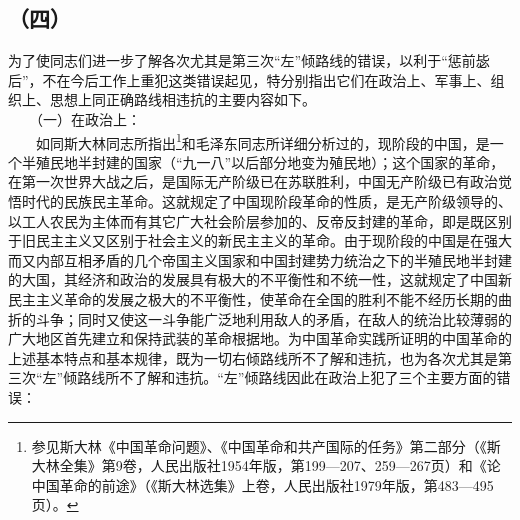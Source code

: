 \documentclass[cn,11pt,chinese]{elegantbook}
\def\myformat#1{\hfil\hfil #1}
\begin{document}
\subsection*{\myformat{（四）}}
为了使同志们进一步了解各次尤其是第三次“左”倾路线的错误，以利于“惩前毖后”，不在今后工作上重犯这类错误起见，特分别指出它们在政治上、军事上、组织上、思想上同正确路线相违抗的主要内容如下。\\
　　（一）在政治上：\\
　　如同斯大林同志所指出\footnote[15]{ 参见斯大林《中国革命问题》、《中国革命和共产国际的任务》第二部分（《斯大林全集》第9卷，人民出版社1954年版，第199—207、259—267页）和《论中国革命的前途》（《斯大林选集》上卷，人民出版社1979年版，第483—495页）。}和毛泽东同志所详细分析过的，现阶段的中国，是一个半殖民地半封建的国家（“九一八”以后部分地变为殖民地）；这个国家的革命，在第一次世界大战之后，是国际无产阶级已在苏联胜利，中国无产阶级已有政治觉悟时代的民族民主革命。这就规定了中国现阶段革命的性质，是无产阶级领导的、以工人农民为主体而有其它广大社会阶层参加的、反帝反封建的革命，即是既区别于旧民主主义又区别于社会主义的新民主主义的革命。由于现阶段的中国是在强大而又内部互相矛盾的几个帝国主义国家和中国封建势力统治之下的半殖民地半封建的大国，其经济和政治的发展具有极大的不平衡性和不统一性，这就规定了中国新民主主义革命的发展之极大的不平衡性，使革命在全国的胜利不能不经历长期的曲折的斗争；同时又使这一斗争能广泛地利用敌人的矛盾，在敌人的统治比较薄弱的广大地区首先建立和保持武装的革命根据地。为中国革命实践所证明的中国革命的上述基本特点和基本规律，既为一切右倾路线所不了解和违抗，也为各次尤其是第三次“左”倾路线所不了解和违抗。“左”倾路线因此在政治上犯了三个主要方面的错误：\\
\end{document}
